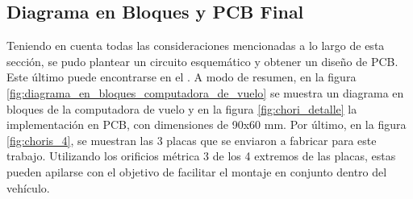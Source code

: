 

\subsection{Diagrama en Bloques y PCB Final}



Teniendo en cuenta todas las consideraciones mencionadas a lo largo de esta sección, se pudo plantear un circuito esquemático y obtener un diseño de PCB. Este último puede encontrarse en el . A modo de resumen, en la figura \ref{fig:diagrama_en_bloques_computadora_de_vuelo} se muestra un diagrama en bloques de la computadora de vuelo y en la figura \ref{fig:chori_detalle} la implementación en PCB, con dimensiones de 90x60 mm. Por último, en la figura \ref{fig:choris_4}, se muestran las 3 placas que se enviaron a fabricar para este trabajo. Utilizando los orificios métrica 3 de los 4 extremos de las placas, estas pueden apilarse con el objetivo de facilitar el montaje en conjunto dentro del vehículo.



